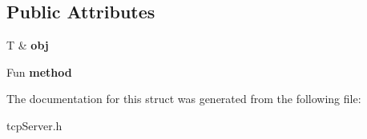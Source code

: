 \subsection*{Public Attributes}
\begin{DoxyCompactItemize}
\item 
\hypertarget{structcppu_1_1TCPServer_1_1CallbackMethod_ae480535d346efc119fb5c43880f349c8}{}T \& {\bfseries obj}\label{structcppu_1_1TCPServer_1_1CallbackMethod_ae480535d346efc119fb5c43880f349c8}

\item 
\hypertarget{structcppu_1_1TCPServer_1_1CallbackMethod_aab858a039ddee71fb65a0e35c173f067}{}Fun {\bfseries method}\label{structcppu_1_1TCPServer_1_1CallbackMethod_aab858a039ddee71fb65a0e35c173f067}

\end{DoxyCompactItemize}


The documentation for this struct was generated from the following file\+:\begin{DoxyCompactItemize}
\item 
tcp\+Server.\+h\end{DoxyCompactItemize}
